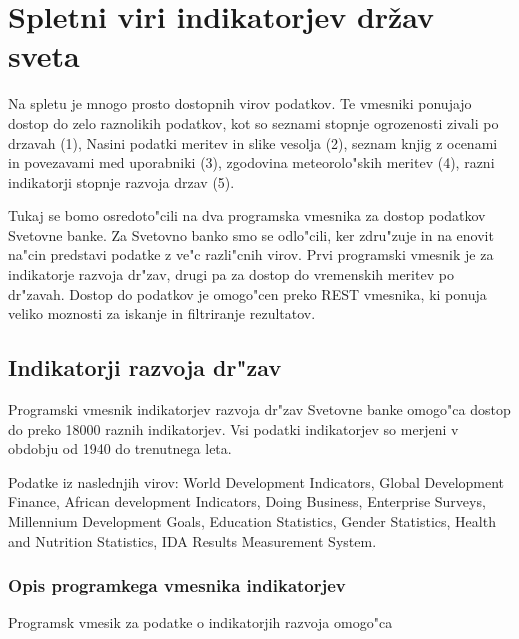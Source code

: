 \chapter{Spletni viri indikatorjev držav sveta}

Na spletu je mnogo prosto dostopnih virov podatkov. Te vmesniki ponujajo dostop
do zelo raznolikih podatkov, kot so seznami stopnje ogrozenosti zivali po
drzavah (1), Nasini podatki meritev in slike vesolja (2), seznam knjig z 
ocenami in povezavami med uporabniki (3), zgodovina meteorolo"skih meritev (4),
razni indikatorji stopnje razvoja drzav (5).



% 
% 
% 
% 




Tukaj se bomo osredoto"cili
na dva programska vmesnika za dostop podatkov Svetovne banke. Za Svetovno banko
smo se odlo"cili, ker zdru"zuje in na enovit na"cin predstavi podatke z ve"c
razli"cnih virov. Prvi programski vmesnik je za indikatorje razvoja dr"zav,
drugi pa za dostop do vremenskih meritev po dr"zavah. Dostop do podatkov je
omogo"cen preko REST vmesnika, ki ponuja veliko moznosti za iskanje in
filtriranje rezultatov.


\section{Indikatorji razvoja dr"zav}

Programski vmesnik indikatorjev razvoja dr"zav Svetovne banke omogo"ca dostop
do preko 18000 raznih indikatorjev. Vsi podatki indikatorjev so merjeni v
obdobju od 1940 do trenutnega leta. 

Podatke iz naslednjih virov:
World Development Indicators, 
Global Development Finance, 
African development Indicators, 
Doing Business,
Enterprise Surveys, 
Millennium Development Goals, 
Education Statistics, 
Gender Statistics,
Health and Nutrition Statistics, 
IDA Results Measurement System.


\subsection{Opis programkega vmesnika indikatorjev}


Programsk vmesik za podatke o indikatorjih razvoja omogo"ca 


